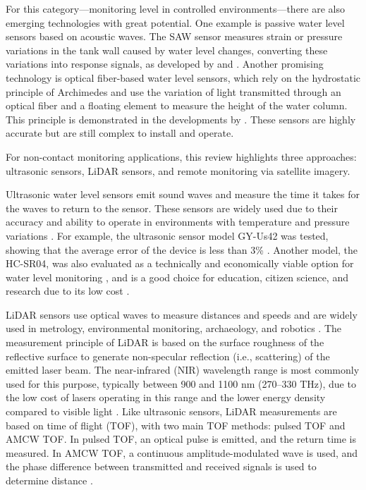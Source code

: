 \documentclass[conference]{IEEEtran}
\begin{document}
For this category—monitoring level in controlled environments—there are also emerging technologies with great potential. One example is passive water level sensors based on acoustic waves. The SAW sensor measures strain or pressure variations in the tank wall caused by water level changes, converting these variations into response signals, as developed by \cite{ali_2020_saw} and \cite{sreejith_2024_modeling}. Another promising technology is optical fiber-based water level sensors, which rely on the hydrostatic principle of Archimedes and use the variation of light transmitted through an optical fiber and a floating element to measure the height of the water column. This principle is demonstrated in the developments by \cite{ramos_2025_high}. These sensors are highly accurate but are still complex to install and operate.

For non-contact monitoring applications, this review highlights three approaches: ultrasonic sensors, LiDAR sensors, and remote monitoring via satellite imagery.

Ultrasonic water level sensors emit sound waves and measure the time it takes for the waves to return to the sensor. These sensors are widely used due to their accuracy and ability to operate in environments with temperature and pressure variations \cite{mohammadrezamasoudimoghaddam_2024_a, pereira_2022_evaluation}. For example, the ultrasonic sensor model GY-Us42 was tested, showing that the average error of the device is less than 3\% \cite{mohammadrezamasoudimoghaddam_2024_a}. Another model, the HC-SR04, was also evaluated as a technically and economically viable option for water level monitoring \cite{pereira_2022_evaluation}, and is a good choice for education, citizen science, and research due to its low cost \cite{bresnahan_2023_a}.

LiDAR sensors use optical waves to measure distances and speeds and are widely used in metrology, environmental monitoring, archaeology, and robotics \cite{behroozpour_2017_lidar, li_2022_a}. The measurement principle of LiDAR is based on the surface roughness of the reflective surface to generate non-specular reflection (i.e., scattering) of the emitted laser beam. The near-infrared (NIR) wavelength range is most commonly used for this purpose, typically between 900 and 1100 nm (270–330 THz), due to the low cost of lasers operating in this range and the lower energy density compared to visible light \cite{li_2022_a, fernandezdiaz_2014_early, smart_2009_river, behroozpour_2017_lidar}. Like ultrasonic sensors, LiDAR measurements are based on time of flight (TOF), with two main TOF methods: pulsed TOF and AMCW TOF. In pulsed TOF, an optical pulse is emitted, and the return time is measured. In AMCW TOF, a continuous amplitude-modulated wave is used, and the phase difference between transmitted and received signals is used to determine distance \cite{li_2022_a}.
\end{document}
